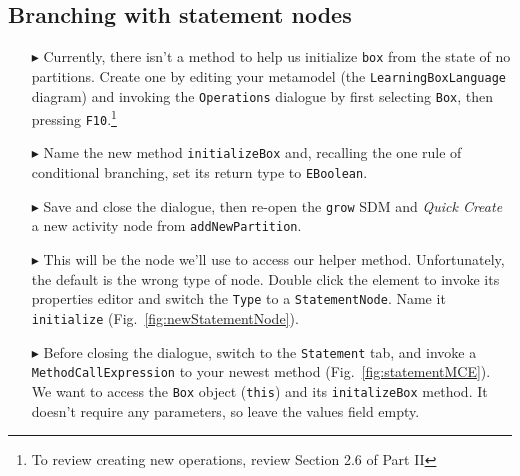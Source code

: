\clearpage
\hypertarget{conBran vis}{}
\subsection{Branching with statement nodes}
\visHeader

\begin{itemize}

\item[$\blacktriangleright$] Currently, there isn't a method to help us initialize \texttt{box} from the state of no partitions. Create one by editing
your metamodel (the \texttt{LearningBoxLanguage} diagram) and invoking the \texttt{Operations} dialogue by first selecting \texttt{Box}, then pressing
\texttt{F10}.\footnote{To review creating new operations, review Section 2.6 of Part II}

\item[$\blacktriangleright$] Name the new method \texttt{initializeBox} and, recalling the one rule of conditional branching, set its return type to
\texttt{EBoolean}.

\item[$\blacktriangleright$] Save and close the dialogue, then re-open the \texttt{grow} SDM and \emph{Quick Create} a new activity node from
\texttt{addNewPartition}.

\item[$\blacktriangleright$] This will be the node we'll use to access our helper method. Unfortunately, the default is the wrong type of node.
Double click the element to invoke its properties editor and switch the \texttt{Type} to a \texttt{StatementNode}. Name it \texttt{initialize}
(Fig.~\ref{fig:newStatementNode}).

\item[$\blacktriangleright$] Before closing the dialogue, switch to the \texttt{Statement} tab, and invoke a \texttt{MethodCallExpression} to your newest
method (Fig.~\ref{fig:statementMCE}). We want to access the \texttt{Box} object (\texttt{this}) and its \texttt{initalizeBox} method. It doesn't require any
parameters, so leave the values field empty. 

\begin{figure}[htbp]
   \centering
      \caption{}
\end{figure}
\FloatBarrier


\end{itemize}
